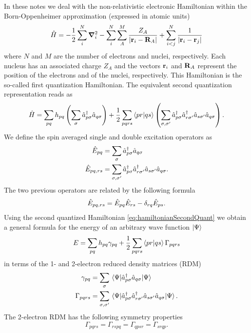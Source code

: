 \documentclass[11pt,a4paper]{article}
\newcommand{\hH}{\Hat{H}} %
\newcommand{\hE}{\Hat{E}} %
\begin{document}
In these notes we deal with the non-relativistic electronic Hamiltonian within the Born-Oppenheimer approximation (expressed in atomic units)
\begin{equation}
  \label{eq:hamiltonianFirstQuant}
  \hH = -\frac{1}{2}\sum_i^N \grad_i^2 - \sum_i^N\sum_A^M\frac{Z_A}{\abs{\vb{r}_i-\vb{R}_A}} + \sum_{i<j}^N\frac{1}{\abs{\vb{r}_i-\vb{r}_j}}
\end{equation}
where $N$ and $M$ are the number of electrons and nuclei, respectively. Each nucleus has an associated charge $Z_A$ and the vectors $\vb{r}_i$ and $\vb{R}_A$ represent the position of the electrons and of the nuclei, respectively. This Hamiltonian is the so-called first quantization Hamiltonian. The equivalent second quantization representation reads as
\begin{equation}
  \label{eq:hamiltonianSecondQuant}
  \hH = \sum_{pq} h_{pq} \left(\sum_\sigma \hat{a}_{p\sigma}^\dagger \hat{a}_{q\sigma}\right) + \frac{1}{2}\sum_{pqrs}\braket{pr}{qs}\left(\sum_{\sigma,\sigma'}\hat{a}_{p\sigma}^\dagger\hat{a}_{r\sigma'}^\dagger\hat{a}_{s\sigma'}\hat{a}_{q\sigma}\right).
\end{equation}
We define the spin averaged single and double excitation operators as
\begin{align}
  \label{eq:excOp}
  \hE_{pq} &=\sum_\sigma \hat{a}_{p\sigma}^\dagger \hat{a}_{q\sigma} \\
  \hE_{pq,rs} &=\sum_{\sigma,\sigma'}\hat{a}_{p\sigma}^\dagger\hat{a}_{r\sigma'}^\dagger\hat{a}_{s\sigma'}\hat{a}_{q\sigma}.
\end{align}
The two previous operators are related by the following formula
\begin{equation}
  \label{eq:excOpRelation}
  \hE_{pq,rs} = \hE_{pq}\hE_{rs}-\delta_{rq}\hE_{ps}.
\end{equation}
Using the second quantized Hamiltonian \ref{eq:hamiltonianSecondQuant} we obtain a general formula for the energy of an arbitrary wave function $\ket{\Psi}$
\begin{equation}
  \label{eq:energyDensityMat}
  E = \sum_{pq}h_{pq} \gamma_{pq} + \frac{1}{2}\sum_{pqrs} \braket{pr}{qs} \Gamma_{pqrs}
\end{equation}
in terms of the 1- and 2-electron reduced density matrices (RDM)
\begin{align}
  \label{eq:densityMat}
  \gamma_{pq}&=\sum_\sigma\mel{\Psi}{\hat{a}_{p\sigma}^\dagger \hat{a}_{q\sigma}}{\Psi}\\
  \Gamma_{pqrs}&=\sum_{\sigma,\sigma'}\mel{\Psi}{\hat{a}_{p\sigma}^\dagger\hat{a}_{r\sigma'}^\dagger\hat{a}_{s\sigma'}\hat{a}_{q\sigma}}{\Psi}.
\end{align}
The 2-electron RDM has the following symmetry properties
\begin{equation}
  \label{eq:2RDMsymmetry}
  \Gamma_{pqrs}=\Gamma_{rspq}=\Gamma_{qpsr}=\Gamma_{srqp}.
\end{equation}
\end{document}
